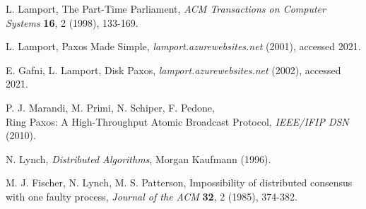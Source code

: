 \documentclass[12pt]{article}
\begin{document}
\begin{thebibliography}{6}

  L. Lamport,
  The Part-Time Parliament,
  \textit{ACM Transactions on Computer Systems} \textbf{16}, 2 (1998), 133-169.

  L. Lamport,
  Paxos Made Simple,
  \textit{lamport.azurewebsites.net} (2001), accessed 2021.

  E. Gafni, L. Lamport,
  Disk Paxos,
  \textit{lamport.azurewebsites.net} (2002), accessed 2021.

  P. J. Marandi, M. Primi, N. Schiper, F. Pedone,\\
  Ring Paxos: A High-Throughput Atomic Broadcast Protocol,
  \textit{IEEE/IFIP DSN} (2010).

  N. Lynch, \textit{Distributed Algorithms},
  Morgan Kaufmann (1996).

  M. J. Fischer, N. Lynch, M. S. Patterson,
  Impossibility of distributed consensus with one faulty process,
  \textit{Journal of the ACM} \textbf{32}, 2 (1985), 374-382.
  


\end{thebibliography}
\end{document}
